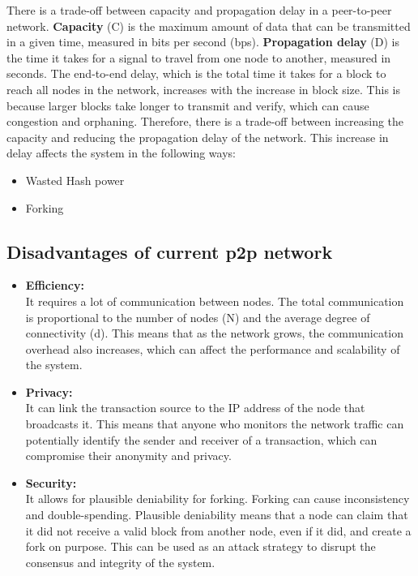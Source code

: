 There is a trade-off between capacity and propagation delay in a peer-to-peer network. \textbf{Capacity} (C) is the maximum amount of data that can be transmitted in a given time, measured in bits per second (bps). \textbf{Propagation delay} (D) is the time it takes for a signal to travel from one node to another, measured in seconds. The end-to-end delay, which is the total time it takes for a block to reach all nodes in the network, increases with the increase in block size. This is because larger blocks take longer to transmit and verify, which can cause congestion and orphaning. Therefore, there is a trade-off between increasing the capacity and reducing the propagation delay of the network. This increase in delay affects the system in the following ways:
\begin{itemize}
    \item Wasted Hash power
    \item Forking
\end{itemize}
\subsection{Disadvantages of current p2p network}
\begin{itemize}
    \item \textbf{Efficiency:} \\ It requires a lot of communication between nodes. The total communication is proportional to the number of nodes (N) and the average degree of connectivity (d). This means that as the network grows, the communication overhead also increases, which can affect the performance and scalability of the system.
    \item \textbf{Privacy:} \\ It can link the transaction source to the IP address of the node that broadcasts it. This means that anyone who monitors the network traffic can potentially identify the sender and receiver of a transaction, which can compromise their anonymity and privacy.
    \item \textbf{Security:} \\ It allows for plausible deniability for forking. Forking can cause inconsistency and double-spending. Plausible deniability means that a node can claim that it did not receive a valid block from another node, even if it did, and create a fork on purpose. This can be used as an attack strategy to disrupt the consensus and integrity of the system.
\end{itemize}

